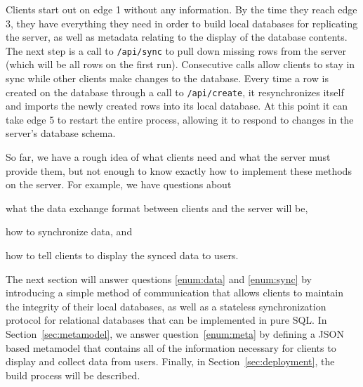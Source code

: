 Clients start out on edge 1 without any information. By the time they reach edge
3, they have everything they need in order to build local databases for
replicating the server, as well as metadata relating to the display of the
database contents. The next step is a call to \texttt{/api/sync} to pull down
missing rows from the server (which will be all rows on the first run).
Consecutive calls allow clients to stay in sync while other clients make
changes to the database. Every time a row is created on the database through
a call to \texttt{/api/create}, it resynchronizes itself and imports the newly
created rows into its local database. At this point it can take edge 5 to
restart the entire process, allowing it to respond to changes in the server's
database schema.

So far, we have a rough idea of what clients need and what the server
must provide them, but not enough to know exactly how to implement these methods
on the server. For example, we have questions about
\begin{inparaenum}
\item\label{enum:data} what the data exchange format between clients and the server will be, 
\item\label{enum:sync} how to synchronize data, and
\item\label{enum:meta} how to tell clients to display the synced data to users. 
\end{inparaenum}

The next section will answer questions \ref{enum:data} and
\ref{enum:sync} by introducing a simple method of communication that allows
clients to maintain the integrity of their local databases, as well as a
stateless synchronization protocol for relational databases that can be
implemented in pure SQL. In Section~\ref{sec:metamodel}, we answer
question~\ref{enum:meta} by defining a JSON based metamodel that contains all of
the information necessary for clients to display and collect data from users.
Finally, in Section~\ref{sec:deployment}, the build process will be described.





